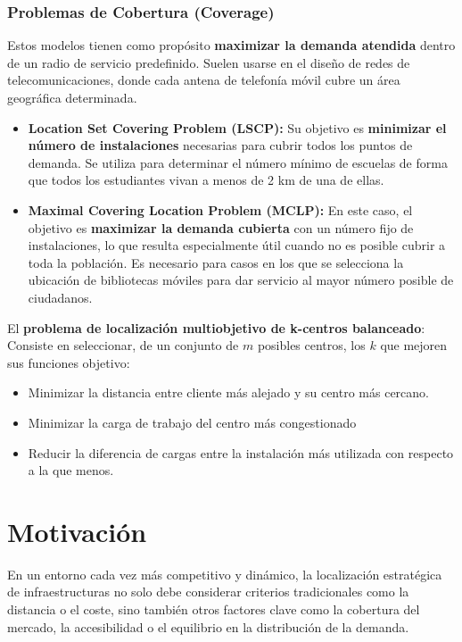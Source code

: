 \documentclass[12pt,a4paper]{book}
\begin{document}
\subsubsection{Problemas de Cobertura (Coverage)} 
Estos modelos tienen como propósito \textbf{maximizar la demanda atendida} dentro de un radio de servicio predefinido. 
Suelen usarse en el diseño de redes de telecomunicaciones, donde cada antena de telefonía móvil cubre un área geográfica determinada.

\begin{itemize}
    \item \textbf{Location Set Covering Problem (LSCP):}
    Su objetivo es \textbf{minimizar el número de instalaciones} necesarias para cubrir todos los puntos de demanda.
Se utiliza para determinar el número mínimo de escuelas de forma que todos los estudiantes vivan a menos de 2 km de una de ellas.

    \item \textbf{Maximal Covering Location Problem (MCLP):}
En este caso, el objetivo es \textbf{maximizar la demanda cubierta} con un número fijo de instalaciones, lo que resulta especialmente útil cuando no es posible cubrir a toda la población.
Es necesario para casos en los que se selecciona la ubicación de bibliotecas móviles para dar servicio al mayor número posible de ciudadanos.

\end{itemize}

El \textbf{problema de localización multiobjetivo de k-centros balanceado}: Consiste en seleccionar, de un conjunto de $m$ posibles centros, los $k$ que mejoren sus funciones objetivo:
\begin{itemize}
    \item Minimizar la distancia entre cliente más alejado y su centro más cercano.
    \item Minimizar la carga de trabajo del centro más congestionado
    \item Reducir la diferencia de cargas entre la instalación más utilizada con respecto a la que menos.
\end{itemize}

\section{Motivación}

En un entorno cada vez más competitivo y dinámico, la localización estratégica de infraestructuras no solo debe considerar criterios tradicionales como la distancia o el coste, sino también otros factores clave como la cobertura del mercado, la accesibilidad o el equilibrio en la distribución de la demanda.
\end{document}
